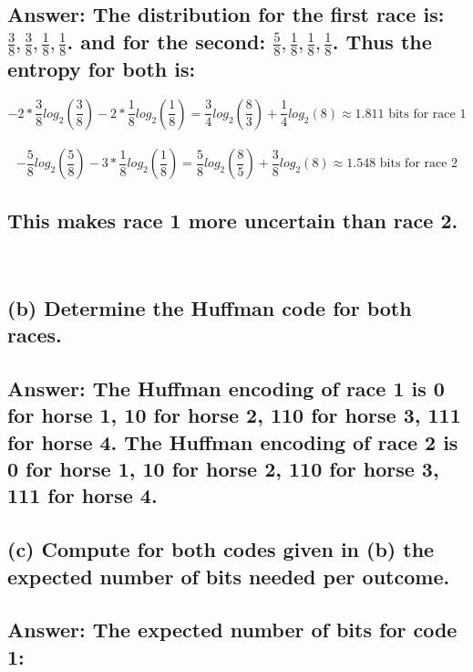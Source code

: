 \documentclass[15px]{article}
\begin{document}
\subsection*{ Answer: The distribution for the first race is: \(\frac{3}{8},\frac{3}{8},\frac{1}{8},\frac{1}{8}\). and for the second: \(\frac{5}{8},\frac{1}{8},\frac{1}{8},\frac{1}{8}\). Thus the entropy for both is:}
\begin{equation}
-2*\frac{3}{8}log_2(\frac{3}{8}) - 2*\frac{1}{8}log_2(\frac{1}{8}) = \frac{3}{4}log_2(\frac{8}{3}) + \frac{1}{4}log_2(8) \approx 1.811 \text{ bits for race 1} 
\end{equation} \\

\begin{equation}
-\frac{5}{8}log_2(\frac{5}{8}) - 3*\frac{1}{8}log_2(\frac{1}{8}) = \frac{5} {8}log_2(\frac{8}{5}) + \frac{3}{8}log_2(8) \approx 1.548 \text{ bits for race 2}
\end{equation}

\subsection*{ This makes race 1 more uncertain than race 2.} \\

\subsection*{\normalfont(b) Determine the Huffman code for both races.}

\subsection*{ Answer: The Huffman encoding of race 1 is 0 for horse 1, 10 for horse 2, 110 for horse 3, 111 for horse 4. The Huffman encoding of race 2 is 0 for horse 1, 10 for horse 2, 110 for horse 3, 111 for horse 4.}

\subsection*{\normalfont(c) Compute for both codes given in (b) the expected number of bits needed per outcome.}

\subsection*{ Answer: The expected number of bits for code 1:}
\end{document}
